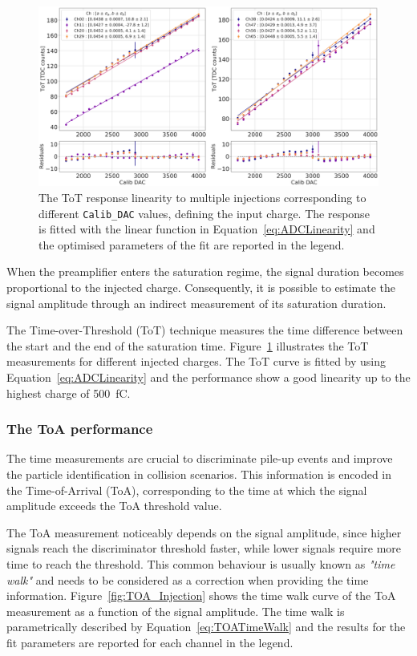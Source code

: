 \begin{figure}[b!]
    \centering
    \includegraphics[width=0.7\linewidth]{Figures/HGCAL/TOT_Injection.pdf}
    \caption{The ToT response linearity to multiple injections corresponding to different \texttt{Calib\_DAC} values, defining the input charge. The  response is fitted with the linear function in Equation~\ref{eq:ADCLinearity} and the optimised parameters of the fit are reported in the legend.}
    \label{fig:TOT_Injection}
\end{figure}

When the preamplifier enters the saturation regime, the signal duration becomes proportional to the injected charge. Consequently, it is possible to estimate the signal amplitude through an indirect measurement of its saturation duration.

The Time-over-Threshold (ToT) technique measures the time difference between the start and the end of the saturation time. Figure~\ref{fig:TOT_Injection} illustrates the ToT measurements for different injected charges. The ToT curve is fitted by using Equation~\ref{eq:ADCLinearity} and the performance show a good linearity up to the highest charge of 500~fC. 

\subsubsection{The ToA performance}
\label{subsubsec:The ToA performance}

The time measurements are crucial to discriminate pile-up events and improve the particle identification in collision scenarios. This information is encoded in the Time-of-Arrival (ToA), corresponding to the time at which the signal amplitude exceeds the ToA threshold value.

The ToA measurement noticeably depends on the signal amplitude, since higher signals reach the discriminator threshold faster, while lower signals require more time to reach the threshold. This common behaviour is usually known as \textit{"time walk"} and needs to be considered as a correction when providing the time information.
Figure~\ref{fig:TOA_Injection} shows the time walk curve of the ToA measurement as a function of the signal amplitude. The time walk is parametrically described by Equation~\ref{eq:TOATimeWalk} and the results for the fit parameters are reported for each channel in the legend.

